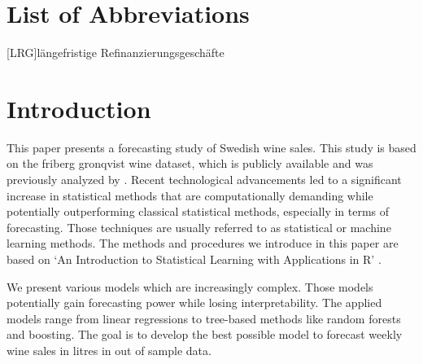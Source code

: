 \documentclass[11pt,]{article}
\begin{document}
\newpage
\listoffigures
{}

\listoftables
{}

\section*{List of Abbreviations}

\begin{adjustwidth}{1.5em}{0pt}

\begin{acronym}[dummyyyy]
 [LRG]{längefristige Refinanzierungsgeschäfte}

\end{acronym}

\end{adjustwidth}

\restoregeometry

\newpage
{}
\hypertarget{introduction}{%
\section{Introduction}\label{introduction}}

This paper presents a forecasting study of Swedish wine sales. This
study is based on the friberg gronqvist wine dataset, which is publicly
available and was previously analyzed by \textcite[][]{Friberg2012}.
Recent technological advancements led to a significant increase in
statistical methods that are computationally demanding while potentially
outperforming classical statistical methods, especially in terms of
forecasting. Those techniques are usually referred to as statistical or
machine learning methods. The methods and procedures we introduce in
this paper are based on `An Introduction to Statistical Learning with
Applications in R' \autocite[][]{James2014}.

We present various models which are increasingly complex. Those models
potentially gain forecasting power while losing interpretability. The
applied models range from linear regressions to tree-based methods like
random forests and boosting. The goal is to develop the best possible
model to forecast weekly wine sales in litres in out of sample data.
\end{document}
